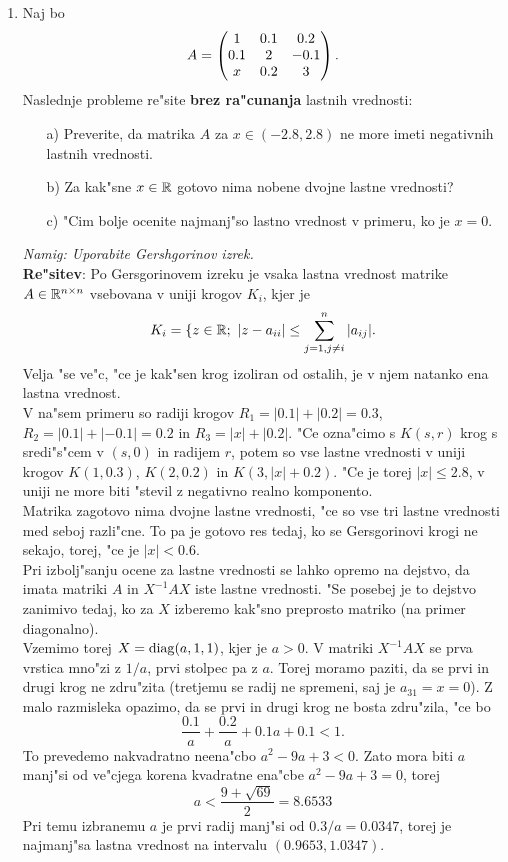 \begin{enumerate}
      
  \item Naj bo 
    $$ 
    A=\begin{pmatrix}
      1   & 0.1 & 0.2\cr
      0.1 &  2  & -0.1\cr
      x   &  0.2& 3
      \end{pmatrix}.
    $$
    Naslednje probleme re"site {\bf brez ra"cunanja} lastnih vrednosti:
    \begin{itemize}
      \item[a)] Preverite, da matrika $A$ za $x\in(-2.8,2.8)$ ne more imeti 
        negativnih lastnih vrednosti. 
      \item[b)] Za kak"sne $x\in\mathbb{R}$ gotovo nima nobene dvojne
        lastne vrednosti? 
      \item[c)] "Cim bolje ocenite najmanj"so lastno vrednost v primeru, 
        ko je $x=0$.
    \end{itemize}
    {\sl Namig: Uporabite Gershgorinov izrek.}\\
    {\bf Re"sitev}: Po Gersgorinovem izreku je vsaka lastna vrednost
    	matrike $A\in \mathbb{R}^{n\times n}$ vsebovana v uniji krogov
    	$K_i$, kjer je 
    	$$K_i=\{z\in\mathbb{R};\ |z-a_{ii}|\leq \sum_{j=1,j\neq i}^n |a_{ij}|.$$
    	Velja "se ve"c, "ce je kak"sen krog izoliran od ostalih, je v njem
    	natanko ena lastna vrednost.\\
    	V na"sem primeru so radiji krogov $R_1=|0.1|+|0.2|=0.3$,
    	$R_2=|0.1|+|-0.1|=0.2$ in $R_3=|x|+|0.2|$.
    	"Ce ozna"cimo s $K(s,r)$ krog s sredi"s"cem v $(s,0)$ in radijem $r$,
    	potem so vse lastne vrednosti v uniji krogov
    	$K(1,0.3)$, $K(2,0.2)$ in $K(3,|x|+0.2)$. "Ce je torej $|x|\leq 2.8$,
    	v uniji ne more biti "stevil z negativno realno komponento.\\
    	Matrika zagotovo nima dvojne lastne vrednosti, "ce so vse tri lastne
    	vrednosti med seboj razli"cne. To pa je gotovo res tedaj, ko se
    	Gersgorinovi krogi ne sekajo, torej, "ce je $|x|<0.6$.\\
    	Pri izbolj"sanju ocene za lastne vrednosti se lahko opremo
    	na dejstvo, da imata matriki $A$ in $X^{-1}AX$ iste lastne vrednosti.
    	"Se posebej je to dejstvo zanimivo tedaj, ko za $X$ izberemo 
    	kak"sno preprosto matriko (na primer diagonalno).\\
    	Vzemimo torej $X={\rm diag}(a,1,1)$, kjer je $a>0$.
    	V matriki $X^{-1}AX$ se prva vrstica mno"zi z $1/a$, prvi
    	stolpec pa z $a$. Torej moramo paziti, da se prvi in drugi
    	krog ne zdru"zita (tretjemu se radij ne spremeni, saj je
    	$a_{31}=x=0$). Z malo razmisleka opazimo, da se
    	prvi in drugi krog ne bosta zdru"zila, "ce bo
    	$$ \frac{0.1}{a}+\frac{0.2}{a}+0.1a+0.1<1.$$
    	To prevedemo nakvadratno neena"cbo $a^2-9a+3<0$.
    	Zato mora biti $a$ manj"si od ve"cjega korena kvadratne ena"cbe
    	$a^2-9a+3=0$, torej
    	$$a<\frac{9+\sqrt{69}}{2}=8.6533$$
    	Pri temu izbranemu $a$ je prvi radij manj"si od 
    	$0.3/a=0.0347$, torej je najmanj"sa lastna vrednost
    	na intervalu $(0.9653,1.0347)$.
    	

\end{enumerate}

